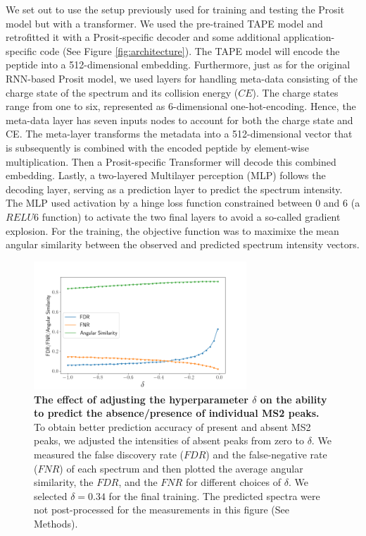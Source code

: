\documentclass[10pt,a4paper]{article}
\begin{document}
We set out to use the setup previously used for training and testing the Prosit model but with a transformer. We used the pre-trained TAPE model \cite{Rao2019-qq} and retrofitted it with a Prosit-specific decoder and some additional application-specific code (See Figure \ref{fig:architecture}). The TAPE model will encode the peptide into a 512-dimensional embedding. Furthermore, just as for the original RNN-based Prosit model, we used layers for handling meta-data consisting of the charge state of the spectrum and its collision energy ($\textit{CE}$). The charge states range from one to six, represented as 6-dimensional one-hot-encoding. Hence, the meta-data layer has seven inputs nodes to account for both the charge state and CE. The meta-layer transforms the metadata into a 512-dimensional vector that is subsequently is combined with the encoded peptide by element-wise multiplication. Then a Prosit-specific Transformer will decode this combined embedding. Lastly, a two-layered Multilayer perception (MLP) follows the decoding layer, serving as a prediction layer to predict the spectrum intensity. The MLP used activation by a hinge loss function constrained between 0 and 6 (a $\textit{RELU6}$ function) to activate the two final layers to avoid a so-called gradient explosion. For the training, the objective function was to maximixe  the mean angular similarity between the observed and predicted spectrum intensity vectors.


\begin{figure}[htb!]
    \centering
    \includegraphics[width=8cm]{./img/compare_delta.png}
    \caption{{\bf The effect of adjusting the hyperparameter $\delta$ on the ability to predict the absence/presence of individual MS2 peaks.} To obtain better prediction accuracy of present and absent MS2 peaks, we adjusted the intensities of absent peaks from zero to $\delta$. We measured the false discovery rate ($\mathit{FDR}$) and the false-negative rate ($\mathit{FNR}$) of each spectrum and then plotted the average angular similarity, the $\mathit{FDR}$, and the $\mathit{FNR}$ for different choices of $\delta$. We selected $\delta=0.34$ for the final training.  The predicted spectra were not post-processed for the measurements in this figure (See Methods). \label{fig:delta}}
\end{figure}
    
\end{document}
